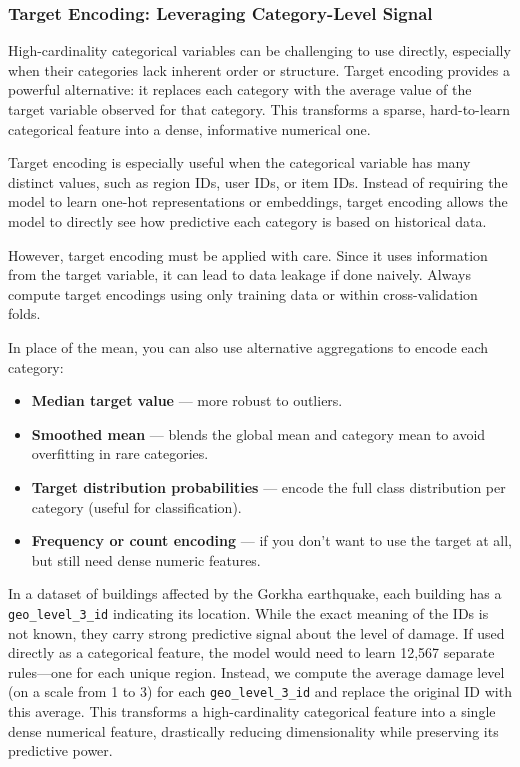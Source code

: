\documentclass[12pt,openany]{book}
\begin{document}
\subsubsection{Target Encoding: Leveraging Category-Level Signal}

High-cardinality categorical variables can be challenging to use directly, especially when their categories lack inherent order or structure. Target encoding provides a powerful alternative: it replaces each category with the average value of the target variable observed for that category. This transforms a sparse, hard-to-learn categorical feature into a dense, informative numerical one.
\newline

Target encoding is especially useful when the categorical variable has many distinct values, such as region IDs, user IDs, or item IDs. Instead of requiring the model to learn one-hot representations or embeddings, target encoding allows the model to directly see how predictive each category is based on historical data.
\newline

However, target encoding must be applied with care. Since it uses information from the target variable, it can lead to data leakage if done naively. Always compute target encodings using only training data or within cross-validation folds.
\newline

In place of the mean, you can also use alternative aggregations to encode each category:
\begin{itemize}
  \item \textbf{Median target value} — more robust to outliers.
  \item \textbf{Smoothed mean} — blends the global mean and category mean to avoid overfitting in rare categories.
  \item \textbf{Target distribution probabilities} — encode the full class distribution per category (useful for classification).
  \item \textbf{Frequency or count encoding} — if you don’t want to use the target at all, but still need dense numeric features.
\end{itemize}

\begin{examplebox}
In a dataset of buildings affected by the Gorkha earthquake, each building has a \texttt{geo\_level\_3\_id} indicating its location. While the exact meaning of the IDs is not known, they carry strong predictive signal about the level of damage. If used directly as a categorical feature, the model would need to learn 12,567 separate rules—one for each unique region. Instead, we compute the average damage level (on a scale from 1 to 3) for each \texttt{geo\_level\_3\_id} and replace the original ID with this average. This transforms a high-cardinality categorical feature into a single dense numerical feature, drastically reducing dimensionality while preserving its predictive power.
\end{examplebox}
\end{document}
